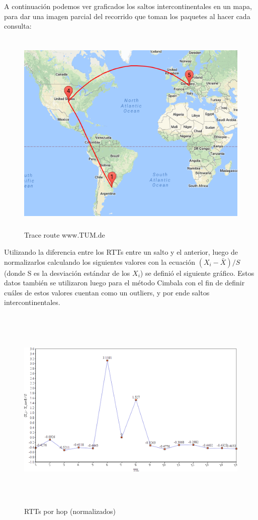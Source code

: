 \documentclass[a4paper,10pt]{article}
\begin{document}
\medskip
\medskip

\par{A continuación podemos ver graficados los saltos intercontinentales en un mapa, para dar una imagen parcial del recorrido que toman los paquetes al hacer cada consulta: }
\medskip
\begin{figure}[H]
    \centering
    \includegraphics[height=10cm]{imagenes/tracerouteToTUM.png}
    \caption{Trace route www.TUM.de}
\end{figure}


\medskip
\medskip
\par{Utilizando la diferencia entre los RTTs entre un salto y el anterior, luego de normalizarlos calculando los siguientes valores con la ecuación $(X_{i} - \bar{X}) /S $ (donde S es la desviación estándar de los $X_{i}$) se definió el siguiente gráfico. Estos datos también se utilizaron luego para el método Cimbala con el fin de definir cuáles de estos valores cuentan como un outliers, y por ende saltos intercontinentales.}

\medskip
\begin{figure}[H]
    \centering
    \includegraphics[height=10cm]{imagenes/valorZTUM.png}
    \caption{RTTs por hop (normalizados)}
\end{figure}
\end{document}
